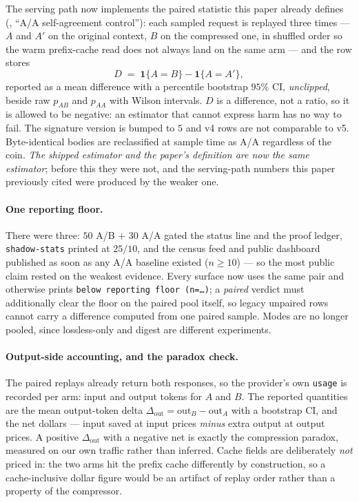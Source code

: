 \documentclass[11pt]{article}
\begin{document}
The serving path now implements the paired statistic this paper already defines
(, ``A/A self-agreement control''): each sampled request is replayed three
times --- $A$ and $A'$ on the original context, $B$ on the compressed one, in shuffled order
so the warm prefix-cache read does not always land on the same arm --- and the row stores
\[
  D \;=\; \mathbf{1}\{A = B\} - \mathbf{1}\{A = A'\},
\]
reported as a mean difference with a percentile bootstrap $95\%$ CI, \emph{unclipped}, beside
raw $p_{AB}$ and $p_{AA}$ with Wilson intervals. $D$ is a difference, not a ratio, so it is
allowed to be negative: an estimator that cannot express harm has no way to fail. The
signature version is bumped to $5$ and v4 rows are not comparable to v5. Byte-identical bodies
are reclassified at sample time as A/A regardless of the coin. \emph{The shipped estimator and
the paper's definition are now the same estimator}; before this they were not, and the
serving-path numbers this paper previously cited were produced by the weaker one.

\paragraph{One reporting floor.} There were three: $50$ A/B $+$ $30$ A/A gated the status line
and the proof ledger, \texttt{shadow-stats} printed at $25/10$, and the census feed and public
dashboard published as soon as any A/A baseline existed ($n\ge10$) --- so the most public
claim rested on the weakest evidence. Every surface now uses the same pair and otherwise
prints \texttt{below reporting floor (n=\ldots)}; a \emph{paired} verdict must additionally
clear the floor on the paired pool itself, so legacy unpaired rows cannot carry a difference
computed from one paired sample. Modes are no longer pooled, since lossless-only and digest
are different experiments.

\paragraph{Output-side accounting, and the paradox check.} The paired replays already return
both responses, so the provider's own \texttt{usage} is recorded per arm: input and output
tokens for $A$ and $B$. The reported quantities are the mean output-token delta
$\Delta_{\text{out}} = \text{out}_B - \text{out}_A$ with a bootstrap CI, and the net dollars
--- input saved at input prices \emph{minus} extra output at output prices. A positive
$\Delta_{\text{out}}$ with a negative net is exactly the compression paradox, measured on our
own traffic rather than inferred. Cache fields are deliberately \emph{not} priced in: the two
arms hit the prefix cache differently by construction, so a cache-inclusive dollar figure
would be an artifact of replay order rather than a property of the compressor.
\end{document}
